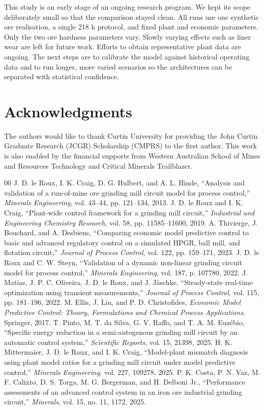 \documentclass[conference]{IEEEtran}
\begin{document}
This study is an early stage of an ongoing research program. We kept
its scope deliberately small so that the comparison stayed clean. All
runs use one synthetic ore realisation, a single 218 h protocol, and
fixed plant and economic parameters. Only the two ore hardness
parameters vary. Slowly varying effects such as liner wear are left
for future work. Efforts to obtain representative plant data are
ongoing. The next steps are to calibrate the model against historical
operating data and to run longer, more varied scenarios so the
architectures can be separated with statistical confidence.

\section*{Acknowledgments}

The authors would like to thank Curtin University for providing the
John Curtin Graduate Research (JCGR) Scholarship (CMPRS) to the first
author. This work is also enabled by the financial supports from
Western Australian School of Mines and Resources Technology and
Critical Minerals Trailblazer.

\begin{thebibliography}{00}
 J. D. le Roux, I. K. Craig, D. G. Hulbert, and A. L.
Hinde, ``Analysis and validation of a run-of-mine ore grinding mill
circuit model for process control,'' \emph{Minerals Engineering}, vol.
43--44, pp. 121--134, 2013.
 J. D. le Roux and I. K. Craig, ``Plant-wide control
framework for a grinding mill circuit,'' \emph{Industrial and Engineering
Chemistry Research}, vol. 58, pp. 11585--11600, 2019.
 A. Thivierge, J. Bouchard, and A. Desbiens,
``Comparing economic model predictive control to basic and advanced
regulatory control on a simulated HPGR, ball mill, and flotation
circuit,'' \emph{Journal of Process Control}, vol. 122, pp. 159--171,
2023.
 J. D. le Roux and C. W. Steyn, ``Validation of a
dynamic non-linear grinding circuit model for process control,''
\emph{Minerals Engineering}, vol. 187, p. 107780, 2022.
 J. Matias, J. P. C. Oliveira, J. D. le Roux, and J.
J\"{a}schke, ``Steady-state real-time optimization using transient
measurements,'' \emph{Journal of Process Control}, vol. 115, pp. 181--196,
2022.
 M. Ellis, J. Liu, and P. D. Christofides,
\emph{Economic Model Predictive Control: Theory, Formulations and Chemical
Process Applications}. Springer, 2017.
 T. Pinto, M. T. da Silva, G. V. Raffo, and T. A. M.
Euz\'ebio, ``Specific energy reduction in a semi-autogenous grinding mill
circuit by an automatic control system,'' \emph{Scientific Reports},
vol. 15, 21398, 2025.
 H. K. Mittermaier, J. D. le Roux, and I. K.
Craig, ``Model-plant mismatch diagnosis using plant model ratios for a
grinding mill circuit under model predictive control,'' \emph{Minerals
Engineering}, vol. 227, 109278, 2025.
 P. K. Costa, P. N. Vaz, M. F. Calixto, D. S. Torga,
M. G. Bergerman, and H. Delboni Jr., ``Performance assessments of an
advanced control system in an iron ore industrial grinding circuit,''
\emph{Minerals}, vol. 15, no. 11, 1172, 2025.
\end{thebibliography}
\end{document}
